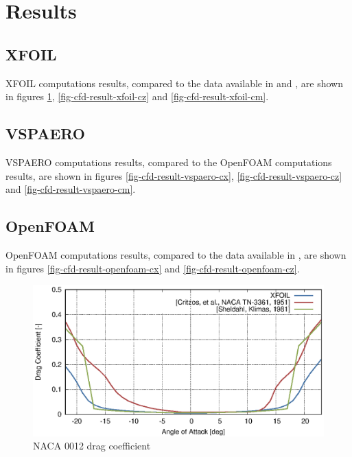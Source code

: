 \section{Results}

\subsection{XFOIL}

XFOIL computations results, compared to the data available in \cite{NACA-TN-3361} and \cite{SheldahiKlimas1981}, are shown in figures \ref{fig-cfd-result-xfoil-cx}, \ref{fig-cfd-result-xfoil-cz} and \ref{fig-cfd-result-xfoil-cm}.

\subsection{VSPAERO}

VSPAERO computations results, compared to the OpenFOAM computations results, are shown in figures \ref{fig-cfd-result-vspaero-cx}, \ref{fig-cfd-result-vspaero-cz} and \ref{fig-cfd-result-vspaero-cm}.

\subsection{OpenFOAM}

OpenFOAM computations results, compared to the data available in \cite{NASA-TP-1538}, are shown in figures \ref{fig-cfd-result-openfoam-cx} and \ref{fig-cfd-result-openfoam-cz}.

\clearpage

\begin{figure}
  \centering
  \includegraphics[width=140mm]{images/xfoil_naca0012_cx.eps}
  \caption{NACA 0012 drag coefficient}
  \label{fig-cfd-result-xfoil-cx}
\end{figure}


